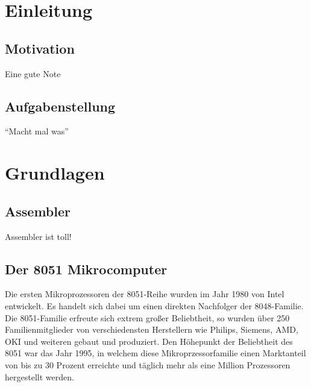 


\newcommand{\autor}{Heidinger, Matthis, Riesinger, Stephan}
\newcommand{\kurs}{TINF17B1}
\newcommand{\titel}{4-Gewinnt auf einem Mikrocomputer der 8051-Famile}



\tableofcontents 

\chapter{Einleitung}

\section{Motivation}

Eine gute Note

\section{Aufgabenstellung}

\enquote{Macht mal was}

\chapter{Grundlagen}

\section{Assembler}

Assembler ist toll!

\section{Der 8051 Mikrocomputer}

Die ersten Mikroprozessoren der 8051-Reihe wurden im Jahr 1980 von Intel entwickelt. Es handelt sich dabei um einen direkten Nachfolger der 8048-Familie.
Die 8051-Familie erfreute sich extrem großer Beliebtheit, so wurden über 250 Familienmitglieder von verschiedensten Herstellern wie Philips, Siemens, AMD, OKI und weiteren gebaut und produziert. Den Höhepunkt der Beliebtheit des 8051 war das Jahr 1995, in welchem diese Mikroprzessorfamilie einen Marktanteil von bis zu 30 Prozent erreichte und täglich mehr als eine Million Prozessoren hergestellt werden. 

